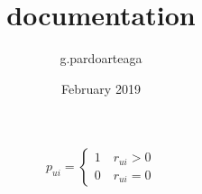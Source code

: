 \documentclass{article}
\title{documentation}
\author{g.pardoarteaga }
\date{February 2019}
\begin{document}
\[
  p_{ui}=\begin{cases}
               1 \quad r_{ui}>0\\
               0 \quad r_{ui}=0
            \end{cases}
\]
\end{document}

